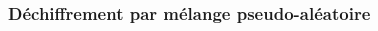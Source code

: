         \begin{frame}
            \frametitle{Déchiffrement par mélange pseudo-aléatoire}
            \pause
            \begin{columns}
                \begin{column}{.45\linewidth}
                \end{column}
                \pause
                \begin{column}{.45\linewidth}
                \end{column}
            \end{columns}
        \end{frame}

